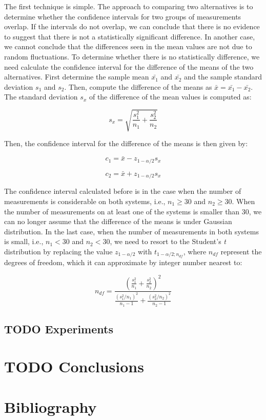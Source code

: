 \documentclass{latex/classes/thesis}
\begin{document}
The first technique is simple. The approach to comparing two alternatives is
to determine whether the confidence intervals for two groups of measurements
overlap. If the intervals do not overlap, we can conclude that there is no
evidence to suggest that there is not a statistically significant
difference. In another case, we cannot conclude that the differences seen in
the mean values are not due to random fluctuations. To determine whether
there is no statistically difference, we need calculate the confidence
interval for the difference of the means of the two alternatives. First
determine the sample mean \(\bar{x_1}\) and \(\bar{x_2}\) and the sample
standard deviation \(s_1\) and \(s_2\). Then, compute the difference of the
means as \(\bar{x} = \bar{x_1} - \bar{x_2}\). The standard deviation \(s_x\)
of the difference of the mean values is computed as:

\begin{equation}
  s_x = \sqrt{\frac{s_1^2}{n_1} + \frac{s_2^2}{n_2}}
\end{equation}

Then, the confidence interval for the difference of the means is then given
by:

\begin{equation}
  c_1 = \bar{x} - z_{1 - \alpha/2}s_x
\end{equation}

\begin{equation}
 c_2 = \bar{x} + z_{1 - \alpha/2}s_x
\end{equation}

The confidence interval calculated before is in the case when the number of
measurements is considerable on both systems, i.e., \(n_1 \ge 30\) and \(n_2
   \ge 30\). When the number of measurements on at least one of the systems is
smaller than 30, we can no longer assume that the difference of the means is
under Gaussian distribution. In the last case, when the number of
measurements in both systems is small, i.e., \(n_1 < 30\) and \(n_2 < 30\),
we need to resort to the Student's \emph{t} distribution by replacing the value
\(z_{1 - \alpha/2}\) with \(t_{1 - \alpha/2;n_{df}}\), where \(n_{df}\)
represent the degrees of freedom, which it can approximate by integer number
nearest to:

\begin{equation}
 n_{df} = \frac{(\frac{s_1^2}{n_1} + \frac{s_2^2}{n_2})^2}{\frac{(s_1^2/n_1)^2}{n_1 - 1} + \frac{(s_2^2/n_2)^2}{n_2 - 1}}
\end{equation}







\section{{\bfseries\sffamily TODO} Experiments}
\label{sec:org703a2ee}


\chapter{{\bfseries\sffamily TODO} Conclusions}
\label{sec:org8584026}


\chapter{Bibliography}
\label{sec:orgcfc92f0}


\end{document}
